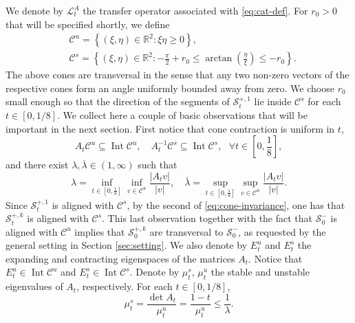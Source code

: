 \documentclass{amsart}
\numberwithin{equation}{section}
\renewcommand{\ge}{\geqslant}
\renewcommand{\le}{\leqslant}
\newcommand\cL{{\mathcal L}}
\newcommand\cS{{\mathcal S}}
\newcommand\bR{{\mathbb R}}
\newcommand{\Int}{\operatorname{Int}}
\begin{document}
We denote by \(\cL^A_t\) the transfer operator associated with \eqref{eq:cat-def}. For \(r_0 > 0\) that will be specified shortly, we define
\[
\begin{split}
&\mathscr C^u = \left\{(\xi,\eta) \in \bR^2: \xi  \eta \ge 0\right\}, \\
&\mathscr C^s = \left\{(\xi, \eta) \in \bR^2: -\frac{\pi}{2} + r_0 \le \arctan\left(\frac{\eta}{\xi}\right) \le  - r_0  \right\}.
\end{split}
\]
The above cones are transversal in the sense that any two non-zero vectors of the respective cones form an angle uniformly bounded away from zero. We choose \(r_0\) small enough so that the direction of the segments of \(\cS_t^{+,1}\) lie inside \(\mathscr C^s\) for each \(t \in [0,1/8]\). We collect here a couple of basic observations that will be important in the next section. First notice that cone contraction is uniform in \(t\),
\begin{equation}\label{eq:cone-invariance}
    A_t \mathscr C^u \subseteq \Int \mathscr C^u, \quad A_t^{-1}\mathscr C^s \subseteq \Int \mathscr C^s, \text{ }\forall t \in \left[0,\frac 1 8\right],
\end{equation}
and there exist \(\lambda, \overline \lambda \in (1, \infty)\) such that
\begin{equation}\label{eq:minimal-contraction}
\lambda = \inf_{t \in \left[0, \frac 1 8\right]}\inf_{v \in \mathscr C^u} \frac{|A_t v |}{|v|}, \quad   \overline \lambda = \sup_{t \in \left[0, \frac 1 8\right]}\sup_{v \in \mathscr C^u} \frac{|A_t v |}{|v|}.
\end{equation}
Since \(\cS_{t}^{+,1}\) is aligned with \(\mathscr C^s\), by the second of \eqref{eq:cone-invariance}, one has that \(\cS_{t}^{+,k}\) is aligned with \(\mathscr C^s\). This last observation together with the fact that \(\cS_0^{-}\) is aligned with \(\mathscr C^u\) implies that \(\cS_{0}^{+,k}\) are transversal to \(\cS_0^{-}\), as requested by the general setting in Section \ref{sec:setting}. We also denote by \(E^u_t\) and \(E^s_t\) the expanding and contracting eigenspaces of the matrices \(A_t\). Notice that \(E^u_t \in \Int \mathscr C^u\) and \(E^s_t \in \Int \mathscr C^s\). Denote by \(\mu^{s}_t\), \(\mu^{u}_t\) the stable and unstable eigenvalues of \(A_t\), respectively. For each \(t \in [0, 1/8]\),
\begin{equation}\label{eq:contraction-uniform-cat}
\mu^s_t = \frac{\det A_t}{\mu^u_t} = \frac{1-t}{\mu^u_t} \le \frac{1}{\lambda}.
\end{equation}\\
\end{document}
